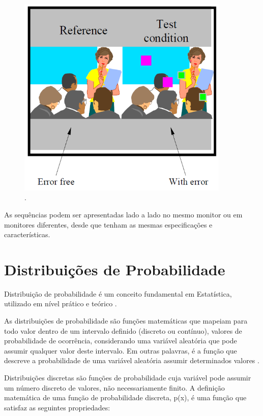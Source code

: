 \begin{figure}[!htb]
	\centering
	\includegraphics[width=0.9\textwidth]{./imgs/sdsce.png}
	\caption{.}
	\label{fig:sdsce}
\end{figure}

As sequências podem ser apresentadas lado a lado no mesmo monitor ou em monitores diferentes, desde que tenham as mesmas especificações e características.

\section{Distribuições de Probabilidade}

Distribuição de probabilidade é um conceito fundamental em Estatística, utilizado em nível prático e teórico \cite{distteoria}.

As distribuições de probabilidade são funções matemáticas que mapeiam para todo valor dentro de um intervalo definido (discreto ou contínuo), valores de probabilidade de ocorrência, considerando uma variável aleatória que pode assumir qualquer valor deste intervalo\cite{distteoria}. Em outras palavras, é a função que descreve a probabilidade de uma variável aleatória assumir determinados valores \cite{wikidistribuicoes}.
 
Distribuições discretas são funções de probabilidade cuja variável pode assumir um número discreto de valores, não necessariamente finito. A definição matemática de uma função de probabilidade discreta, p(x), é uma função que satisfaz as seguintes propriedades:

